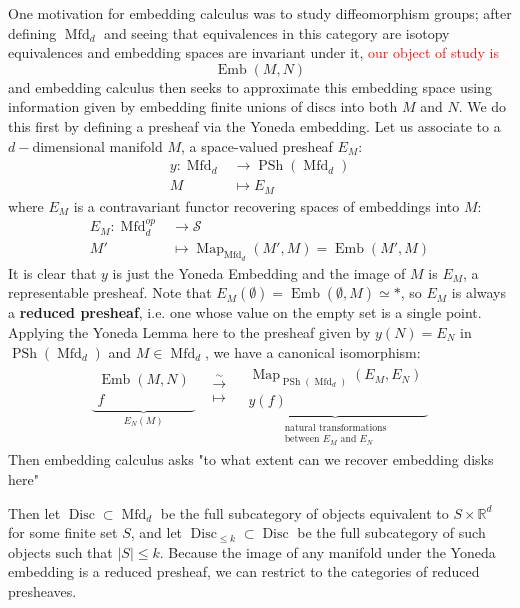 \documentclass{amsart}
\DeclareMathOperator{\Emb}{Emb}
\DeclareMathOperator{\Mfd}{Mfd}
\DeclareMathOperator{\Map}{Map}
\DeclareMathOperator{\Disc}{Disc}
\DeclareMathOperator{\Psh}{PSh}
\theoremstyle{definition}
\theoremstyle{remark}
\theoremstyle{example}
\begin{document}
One motivation for embedding calculus was to study diffeomorphism groups; after defining $\Mfd_d$ and seeing that equivalences in this category are isotopy equivalences and embedding spaces are invariant under it, \textcolor{red}{our object of study is}
\[
\Emb(M,N)
\]
and embedding calculus then seeks to approximate this embedding space using information given by embedding finite unions of discs into both $M$ and $N$.
We do this first by defining a presheaf via the Yoneda embedding. Let us associate to a $d-$dimensional manifold $M$, a space-valued presheaf $E_M$:
\[
\begin{aligned}
    y \colon \Mfd_d &\to \Psh(\Mfd_d) \\
    M &\mapsto E_M
\end{aligned}
\]
where $E_M$ is a contravariant functor recovering spaces of embeddings into $M$:
\[
\begin{aligned}
    E_M \colon \Mfd_d^{op} &\to \mathcal{S}\\
    M' &\mapsto \Map_{\Mfd_d}(M',M) = \Emb(M', M) 
\end{aligned}
\]
It is clear that $y$ is just the Yoneda Embedding and the image of $M$ is $E_M$, a representable presheaf. Note that $E_M(\emptyset) = \Emb(\emptyset, M) \simeq *$, so $E_M$ is always a \textbf{reduced presheaf}, i.e. one whose value on the empty set is a single point. Applying the Yoneda Lemma here to the presheaf given by $y(N) = E_N$ in $\Psh(\Mfd_d)$ and $M \in \Mfd_d$, we have a canonical isomorphism:
\[
\begin{aligned}
    \underbrace{\begin{gathered}
        \Emb(M,N) \\
        f
    \end{gathered}}_{E_N(M)}
    &\begin{gathered}
        \xrightarrow{\sim} \\
        \mapsto
    \end{gathered}
    &\underbrace{\begin{gathered}
        \Map_{\Psh(\Mfd_d)}(E_M, E_N) \\
        y(f)
    \end{gathered}}_{\substack{\text{natural transformations} \\ \text{between } E_M \text{ and } E_N}}
\end{aligned}
\]
Then embedding calculus asks "to what extent can we recover embedding disks here"

Then let $\Disc \subset \Mfd_d$ be the full subcategory of objects equivalent to $S \times \mathbb{R}^d$ for some finite set $S$, and let $\Disc_{\leq k} \subset \Disc$ be the full subcategory of such objects such that $|S| \leq k$. Because the image of any manifold under the Yoneda embedding is a reduced presheaf, we can restrict to the categories of reduced presheaves.
\end{document}
